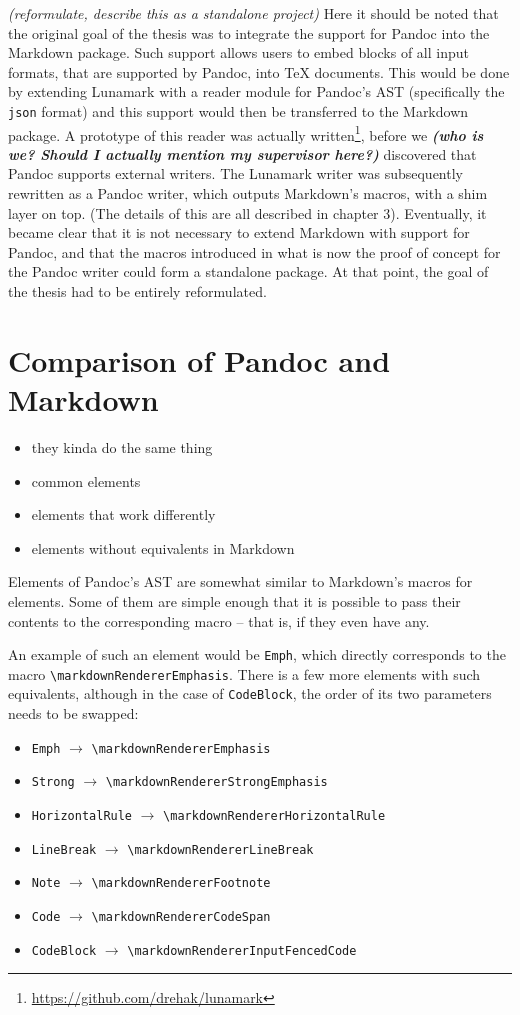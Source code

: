 \documentclass[
  digital,     %
  oneside,     %
  nosansbold,  %
  nocolorbold, %
  lof,         %
  lot,         %
]{fithesis4}
\newcommand{\renderer}[1]{\texttt{\textbackslash{}markdownRenderer{#1}}}
\begin{document}
\textit{(reformulate, describe this as a standalone project)} Here it should be noted that the original goal of the thesis was to integrate the support for Pandoc into the Markdown package. Such support allows users to embed blocks of all input formats, that are supported by Pandoc, into \TeX{} documents. This would be done by extending Lunamark with a reader module for Pandoc's AST (specifically the \texttt{json} format) and this support would then be transferred to the Markdown package. A prototype of this reader was actually written\footnote{\url{https://github.com/drehak/lunamark}}, before we \textbf{\textit{(who is we? Should I actually mention my supervisor here?)}} discovered that Pandoc supports external writers. The Lunamark writer was subsequently rewritten as a Pandoc writer, which outputs Markdown's macros, with a shim layer on top. (The details of this are all described in chapter 3). Eventually, it became clear that it is not necessary to extend Markdown with support for Pandoc, and that the macros introduced in what is now the proof of concept for the Pandoc writer could form a standalone package. At that point, the goal of the thesis had to be entirely reformulated.

\section{Comparison of Pandoc and Markdown}

\begin{itemize}
\item they kinda do the same thing
\item common elements
\item elements that work differently
\item elements without equivalents in Markdown
\end{itemize}

Elements of Pandoc's AST are somewhat similar to Markdown's macros for elements. Some of them are simple enough that it is possible to pass their contents to the corresponding macro -- that is, if they even have any.

An example of such an element would be \texttt{Emph}, which directly corresponds to the macro \renderer{Emphasis}. There is a few more elements with such equivalents, although in the case of \texttt{CodeBlock}, the order of its two parameters needs to be swapped:

\begin{itemize}
\item \texttt{Emph} $\rightarrow$ \renderer{Emphasis}
\item \texttt{Strong} $\rightarrow$ \renderer{StrongEmphasis}
\item \texttt{HorizontalRule} $\rightarrow$ \renderer{HorizontalRule}
\item \texttt{LineBreak} $\rightarrow$ \renderer{LineBreak}
\item \texttt{Note} $\rightarrow$ \renderer{Footnote}
\item \texttt{Code} $\rightarrow$ \renderer{CodeSpan}
\item \texttt{CodeBlock} $\rightarrow$ \renderer{InputFencedCode}
\end{itemize}
\end{document}
